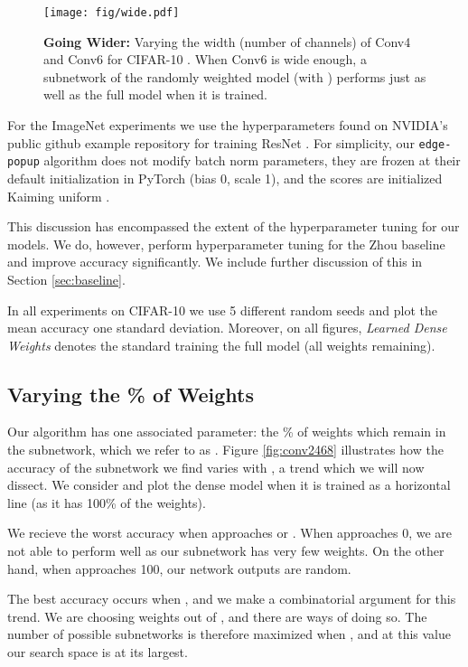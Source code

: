 \documentclass[10pt,twocolumn,letterpaper]{article}
\newcommand{\alg}{\texttt{edge-popup} }
\begin{document}
\begin{figure*}[t!]
    \centering
    \texttt{[image: fig/wide.pdf]}
    \caption{\textbf{Going Wider:} Varying the width (\ie number of channels) of Conv4 and Conv6 for CIFAR-10 \cite{cifar}. When Conv6 is wide enough, a subnetwork of the randomly weighted model (with ) performs just as well as the full model when it is trained.}
    \label{fig:wide}
\end{figure*}
For the ImageNet experiments we use the hyperparameters found on NVIDIA's public github example repository for training ResNet \cite{repo}. For simplicity, our \alg algorithm does not modify batch norm parameters, they are frozen at their default initialization in PyTorch (\ie bias 0, scale 1), and the scores are initialized Kaiming uniform \cite{kaiming-init}.

This discussion has encompassed the extent of the hyperparameter tuning for our models. We do, however, perform hyperparameter tuning for the Zhou \etal \cite{supermask} baseline and improve accuracy significantly. We include further discussion of this in Section \ref{sec:baseline}.

In all experiments on CIFAR-10 \cite{cifar} we use 5 different random seeds and plot the mean accuracy  one standard deviation. Moreover, on all figures, \textit{Learned Dense Weights} denotes the standard training the full model (all weights remaining).

\subsection{Varying the \% of Weights}

Our algorithm has one associated parameter: the \% of weights which remain in the subnetwork, which we refer to as . Figure \ref{fig:conv2468} illustrates how the accuracy of the subnetwork we find varies with , a trend which we will now dissect. We consider  and plot the dense model when it is trained as a horizontal line (as it has 100\% of the weights). 

We recieve the worst accuracy when  approaches  or . When  approaches 0, we are not able to perform well as our subnetwork has very few weights. On the other hand, when  approaches 100, our network outputs are random.

The best accuracy occurs when , and we make a combinatorial argument for this trend. We are choosing  weights out of , and there are  ways of doing so. The number of possible subnetworks is therefore maximized when , and at this value our search space is at its largest.
\end{document}
